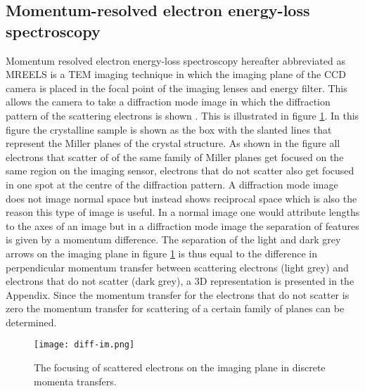 \subsection{Momentum-resolved electron energy-loss spectroscopy}
\label{sec:MREELS}
Momentum resolved electron energy-loss spectroscopy hereafter abbreviated as MREELS is a TEM imaging technique in which the imaging plane of the CCD camera is placed in the focal point of the imaging lenses and energy filter.
This allows the camera to take a diffraction mode image in which the diffraction pattern of the scattering electrons is shown \cite{Bendersky2001,KELTON20017947}. This is illustrated in figure \ref{fig:diff-im}. In this figure the crystalline sample is shown as the box with the slanted lines that represent the Miller planes of the crystal structure.
As shown in the figure all electrons that scatter of of the same family of Miller planes get focused on the same region on the imaging sensor, electrons that do not scatter also get focused in one spot at the centre of the diffraction pattern.
A diffraction mode image does not image normal space but instead shows reciprocal space which is also the reason this type of image is useful. In a normal image one would attribute lengths to the axes of an image but in a diffraction mode image the separation of features is given by a momentum difference.
The separation of the light and dark grey arrows on the imaging plane in figure \ref{fig:diff-im} is thus equal to the difference in perpendicular momentum transfer between scattering electrons (light grey) and electrons that do not scatter (dark grey), a 3D representation is presented in the Appendix.
Since the momentum transfer for the electrons that do not scatter is zero the momentum transfer for scattering of a certain family of planes can be determined.
%
\begin{figure}[H]
	\centering
	\texttt{[image: diff-im.png]}
	\caption{The focusing of scattered electrons on the imaging plane in discrete momenta transfers.}
	\label{fig:diff-im}
\end{figure}
%

